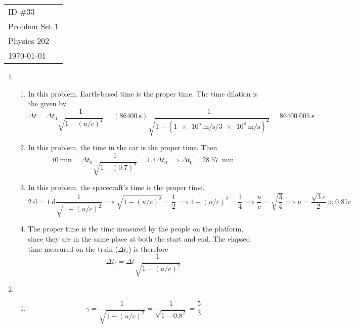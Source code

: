\documentclass[fleqn]{article}[12pt]
\begin{document}
    \begin{tabular}{l}
        ID \#33 \\
        Problem Set 1 \\
        Physics 202 \\
        \today
    \end{tabular}

\begin{enumerate}
    \item \begin{enumerate}
        \item In this problem, Earth-based time is the proper time. The time dilation is the given by
        \begin{equation*}
            \Delta t = \Delta t_0 \frac{1}{\sqrt{1-(u/c)^2}} = (\SI{86400}{\s})\frac{1}{\sqrt{1-(\SI{1e5}{\m/\s}/\SI{3e8}{\m/\s})^2}} = \SI{86400.005}{\s}
        \end{equation*}

        \item In this problem, the time in the car is the proper time. Then
        \begin{equation*}
            \SI{40}{\minute} = \Delta t_0 \frac{1}{\sqrt{1-(0.7)^2}} = 1.4\Delta t_0 \implies \Delta t_0 = \SI{28.57}{\min}
        \end{equation*}

        \item In this problem, the spacecraft's time is the proper time.
        \begin{equation*}
            \SI{2}{\day} = \SI{1}{\day}\frac{1}{\sqrt{1-(u/c)^2}} \implies \sqrt{1-(u/c)^2} = \frac{1}{2} \implies 1-(u/c)^2 = \frac{1}{4} \implies \frac{u}{c} = \sqrt{\frac{3}{4}} \implies u = \frac{\sqrt{3}c}{2}
            \approx 0.87c
        \end{equation*}

        \item The proper time is the time measured by the people on the platform, since they are in the same place at both the start and end. The elapsed time measured on the train ($\Delta t_t$) is therefore
        \begin{equation*}
            \Delta t_t = \Delta t \frac{1}{\sqrt{1-(u/c)^2}}
        \end{equation*}
    \end{enumerate}

    \item \begin{enumerate}
        \item
        \begin{equation*}
            \gamma = \frac{1}{\sqrt{1-(u/c)^2}} = \frac{1}{\sqrt{1-0.8^2}} = \frac{5}{3}
        \end{equation*}


\end{enumerate}
\end{enumerate}
\end{document}
